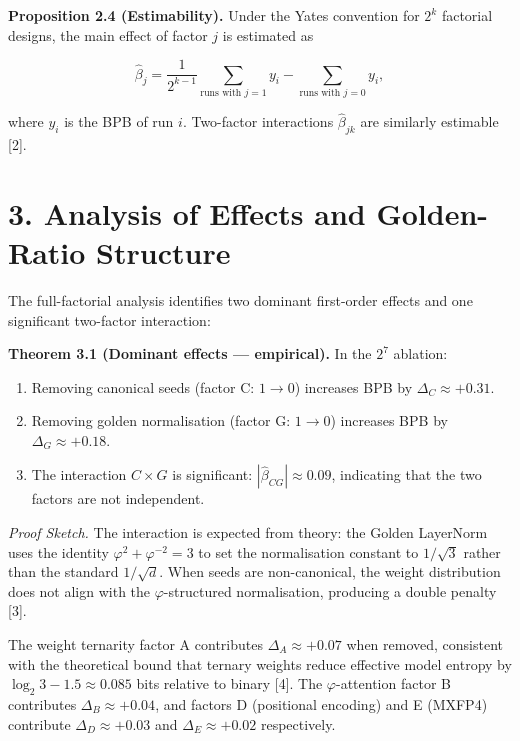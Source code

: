 \textbf{Proposition 2.4 (Estimability).} Under the
Yates convention for \(2^k\) factorial designs,
the main effect of factor \(j\) is estimated as

\[\hat{\beta}_j = \frac{1}{2^{k-1}} \sum_{\text{runs with } j=1} y_i - \sum_{\text{runs with } j=0} y_i,\]

where \(y_i\) is the BPB of run \(i\). Two-factor
interactions \(\hat{\beta}_{jk}\) are similarly
estimable [2].

\section{3. Analysis of Effects and
Golden-Ratio
Structure}\label{fa_17:analysis-of-effects-and-golden-ratio-structure}

The full-factorial analysis identifies two
dominant first-order effects and one significant
two-factor interaction:

\textbf{Theorem 3.1 (Dominant effects ---
empirical).} In the \(2^7\) ablation:

\begin{enumerate}
\def\labelenumi{(\roman{enumi})}
\tightlist
\item
  Removing canonical seeds (factor C: \(1 \to 0\))
  increases BPB by \(\Delta_C \approx +0.31\).
\item
  Removing golden normalisation (factor G:
  \(1 \to 0\)) increases BPB by
  \(\Delta_G \approx +0.18\).
\item
  The interaction \(C \times G\) is significant:
  \(|\hat{\beta}_{CG}| \approx 0.09\), indicating
  that the two factors are not independent.
\end{enumerate}

\emph{Proof Sketch.} The interaction is expected
from theory: the Golden LayerNorm uses the
identity \(\varphi^2 + \varphi^{-2} = 3\) to set
the normalisation constant to \(1/\sqrt{3}\)
rather than the standard \(1/\sqrt{d}\). When
seeds are non-canonical, the weight distribution
does not align with the \(\varphi\)-structured
normalisation, producing a double penalty [3].

The weight ternarity factor A contributes
\(\Delta_A \approx +0.07\) when removed,
consistent with the theoretical bound that ternary
weights reduce effective model entropy by
\(\log_2 3 - 1.5 \approx 0.085\) bits relative to
binary [4]. The \(\varphi\)-attention factor B
contributes \(\Delta_B \approx +0.04\), and
factors D (positional encoding) and E (MXFP4)
contribute \(\Delta_D \approx +0.03\) and
\(\Delta_E \approx +0.02\) respectively.

